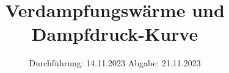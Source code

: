 

\subject{V203}
\title{Verdampfungswärme und Dampfdruck-Kurve}
\date{%
  Durchführung: 14.11.2023
  \hspace{3em}
  Abgabe: 21.11.2023
}



\maketitle
\thispagestyle{empty}
\tableofcontents
\newpage





\printbibliography{}



